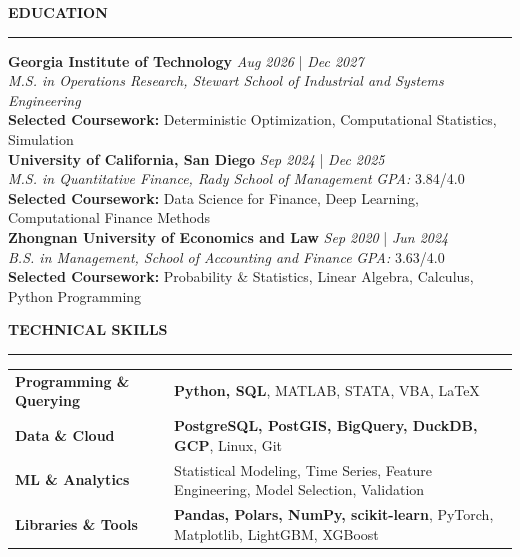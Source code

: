 \documentclass{../original_CV/resume}
\renewcommand{\sectionskip}{\vspace{0.10cm}}
\renewcommand{\sectionlineskip}{\vspace{0.10cm}}
\renewenvironment{rSection}[1]{
\sectionskip
\textcolor{UC San Diego Blue}{\textbf{\large\bfseries\MakeUppercase{#1}}}
\sectionlineskip
\hrule
\begin{list}{}{
\setlength{\leftmargin}{0em}
}
\item[]
}{
\end{list}
}
\begin{document}
\thispagestyle{empty}

\begin{rSection}{EDUCATION}
{\bf Georgia Institute of Technology} \hfill {\em Aug 2026} | {\em Dec 2027}
\\ \textit{M.S. in Operations Research, Stewart School of Industrial and Systems Engineering} \\
\textbf{Selected Coursework:} Deterministic Optimization, Computational Statistics, Simulation \\
{\bf University of California, San Diego} \hfill {\em Sep 2024} | {\em Dec 2025}
\\ \textit{M.S. in Quantitative Finance, Rady School of Management} \hfill \textit{GPA:} 3.84/4.0 \\
\textbf{Selected Coursework:} Data Science for Finance, Deep Learning, Computational Finance Methods \\
{\bf Zhongnan University of Economics and Law} \hfill {\em Sep 2020} | {\em Jun 2024}
\\ \textit{B.S. in Management, School of Accounting and Finance} \hfill \textit{GPA:} 3.63/4.0 \\
\textbf{Selected Coursework:} Probability \& Statistics, Linear Algebra, Calculus, Python Programming
\end{rSection}

\begin{rSection}{TECHNICAL SKILLS} \itemsep -2pt
\begin{tabularx}{\textwidth}{@{} >{\bfseries}l >{\raggedleft\arraybackslash}X @{}}
Programming \& Querying & \textbf{Python, SQL}, MATLAB, STATA, VBA, \LaTeX \\
Data \& Cloud & \textbf{PostgreSQL, PostGIS, BigQuery, DuckDB, GCP}, Linux, Git \\
ML \& Analytics & Statistical Modeling, Time Series, Feature Engineering, Model Selection, Validation \\
Libraries \& Tools & \textbf{Pandas, Polars, NumPy, scikit-learn}, PyTorch, Matplotlib, LightGBM, XGBoost \\
\end{tabularx}
\end{rSection}
\end{document}
